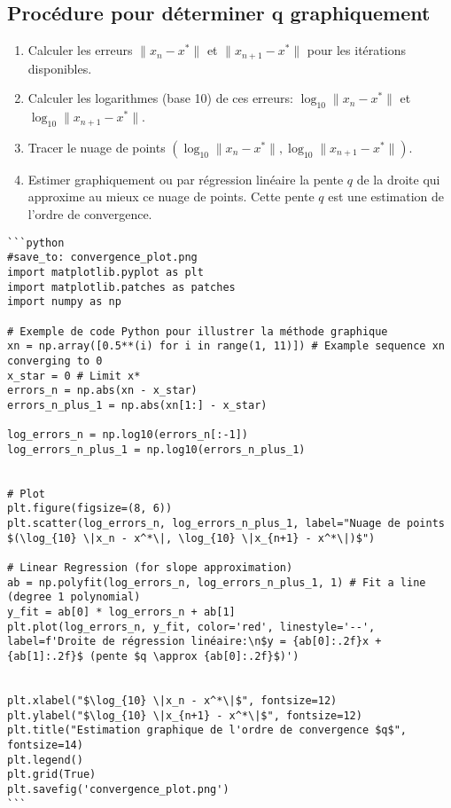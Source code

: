 \documentclass{article}
\begin{document}
\subsection{Procédure pour déterminer q graphiquement}
\begin{enumerate}
    \item Calculer les erreurs $\|x_n - x^*\|$ et $\|x_{n+1} - x^*\|$ pour les itérations disponibles.
    \item Calculer les logarithmes (base 10) de ces erreurs: $\log_{10} \|x_n-x^*\|$ et $\log_{10} \|x_{n+1}-x^*\|$.
    \item Tracer le nuage de points $(\log_{10} \|x_n-x^*\|, \log_{10} \|x_{n+1}-x^*\|)$.
    \item Estimer graphiquement ou par régression linéaire la pente $q$ de la droite qui approxime au mieux ce nuage de points. Cette pente $q$ est une estimation de l'ordre de convergence.
\end{enumerate}

\begin{verbatim}
```python
#save_to: convergence_plot.png
import matplotlib.pyplot as plt
import matplotlib.patches as patches
import numpy as np

# Exemple de code Python pour illustrer la méthode graphique
xn = np.array([0.5**(i) for i in range(1, 11)]) # Example sequence xn converging to 0
x_star = 0 # Limit x*
errors_n = np.abs(xn - x_star)
errors_n_plus_1 = np.abs(xn[1:] - x_star)

log_errors_n = np.log10(errors_n[:-1])
log_errors_n_plus_1 = np.log10(errors_n_plus_1)


# Plot
plt.figure(figsize=(8, 6))
plt.scatter(log_errors_n, log_errors_n_plus_1, label="Nuage de points $(\log_{10} \|x_n - x^*\|, \log_{10} \|x_{n+1} - x^*\|)$")

# Linear Regression (for slope approximation)
ab = np.polyfit(log_errors_n, log_errors_n_plus_1, 1) # Fit a line (degree 1 polynomial)
y_fit = ab[0] * log_errors_n + ab[1]
plt.plot(log_errors_n, y_fit, color='red', linestyle='--', label=f'Droite de régression linéaire:\n$y = {ab[0]:.2f}x + {ab[1]:.2f}$ (pente $q \approx {ab[0]:.2f}$)')


plt.xlabel("$\log_{10} \|x_n - x^*\|$", fontsize=12)
plt.ylabel("$\log_{10} \|x_{n+1} - x^*\|$", fontsize=12)
plt.title("Estimation graphique de l'ordre de convergence $q$", fontsize=14)
plt.legend()
plt.grid(True)
plt.savefig('convergence_plot.png')
```
\end{verbatim}
\end{document}
